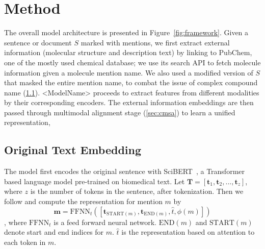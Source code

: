 

\section{Method}
\label{sec:method}



The overall model architecture is presented in Figure~\ref{fig:framework}.  Given a sentence or document $S$ marked with mentions, we first extract external information (molecular structure and description text) by linking to PubChem, one of the mostly used chemical database; we use its search API to fetch molecule information given a molecule mention name. We also used a modified version of $S$ that masked the entire mention name, to combat the issue of complex compound name (\ref{sec:context}). <ModelName> proceeds to extract features from different modalities by their corresponding encoders. The external information embeddings are then passed through multimodal alignment stage (\ref{sec:cmsa}) to learn a unified representation, 




\subsection{Original Text Embedding}
\label{sec:context}
The model first encodes the original sentence with SciBERT~\cite{scibert}, a Transformer~\cite{transformer} based language model pre-trained on biomedical text. Let $\mathbf{T}=[\mathbf{t}_1, \mathbf{t}_2, ..., \mathbf{t}_z]$, where $z$ is the number of tokens in the sentence, after tokenization. Then we follow \cite{e2ecoref} and compute the representation for mention $m$ by $$\mathbf{m}=\text{FFNN}_t([\mathbf{t}_{\text{START}(m)}, \mathbf{t}_{\text{END}(m)}, \hat t, \phi{(m)}])$$, where $\text{FFNN}_t$ is a feed forward neural network. $\text{END}(m)$ and $\text{START}(m)$ denote start and end indices for $m$. $\hat t$ is the representation based on attention to each token in $m$. 

